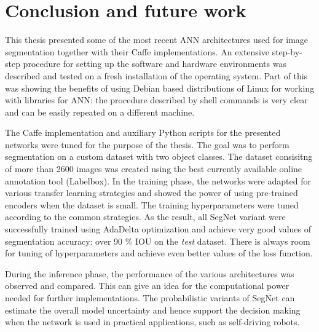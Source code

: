 \clearpage
\chapter{Conclusion and future work}

This thesis presented some of the most recent ANN architectures used for image segmentation together with their Caffe implementations. An extensive step-by-step procedure for setting up the software and hardware environments was described and tested on a fresh installation of the operating system. Part of this was showing the benefits of using Debian based distributions of Linux for working with libraries for ANN: the procedure described by shell commands is very clear and can be easily repeated on a different machine. 

The Caffe implementation and auxiliary Python scripts for the presented networks were tuned for the purpose of the thesis. The goal was to perform segmentation on a custom dataset with two object classes. The dataset consisitng of more than 2600 images was created using the best currently available online annotation tool (Labelbox). In the training phase, the networks were adapted for various transfer learning strategies and showed the power of using pre-trained encoders when the dataset is small. The training hyperparameters were tuned according to the common strategies. As the result, all SegNet variant were successfully trained using AdaDelta optimization and achieve very good values of segmentation accuracy: over 90 \% IOU on the \textit{test} dataset. There is always room for tuning of hyperparameters and achieve even better values of the loss function. 

During the inference phase, the performance of the various architectures was observed and compared. This can give an idea for the computational power needed for further implementations. The probabilistic variants of SegNet can estimate the overall model uncertainty and hence support the decision making when the network is used in practical applications, such as self-driving robots.
